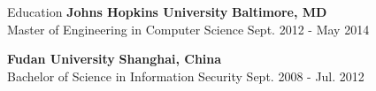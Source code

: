 \documentclass{resume} %
\begin{document}
\begin{rSection}{Education}
{\bf Johns Hopkins University} \hfill {\bf Baltimore, MD} \\
{Master of Engineering in Computer Science} \hfill {Sept. 2012 - May 2014}

{\bf Fudan University} \hfill {\bf Shanghai, China} \\
{Bachelor of Science in Information Security} \hfill {Sept. 2008 - Jul. 2012}
\end{rSection}
\end{document}
